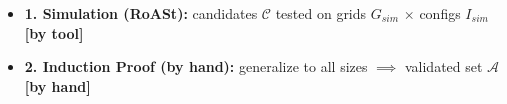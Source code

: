 \begin{frame}{}

\vspace{0.6cm}
\begin{itemize}\setlength\itemsep{0.8cm}
    \item<1-> \textbf{1. Simulation (RoASt):} candidates $\mathcal{C}$ tested on grids $G_{sim}$ $\times$ configs $I_{sim}$ \textbf{\textcolor{accent}{\scriptsize [by tool]}}\pause
          
    \item<2-> \textbf{2. Induction Proof (by hand):} generalize to all sizes $\implies$ validated set $\mathcal{A}$ \textbf{\textcolor{accent}{\scriptsize [by hand]}}
\end{itemize}

\end{frame}

